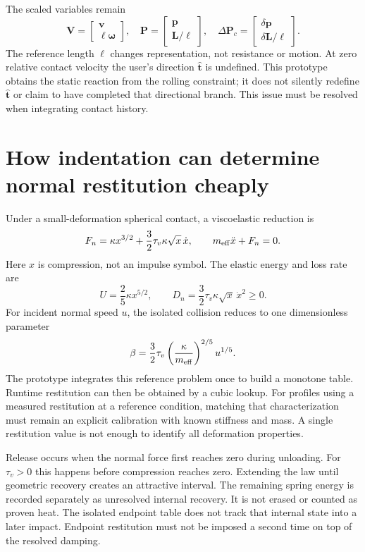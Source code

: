 \documentclass[10pt,a4paper]{article}
\begin{document}
The scaled variables remain
\[
 \mathbf V=\begin{bmatrix}\mathbf v\\\ell\boldsymbol\omega\end{bmatrix},\quad
 \mathbf P=\begin{bmatrix}\mathbf p\\\mathbf L/\ell\end{bmatrix},\quad
 \Delta\mathbf P_c=\begin{bmatrix}\delta\mathbf p\\\delta\mathbf L/\ell\end{bmatrix}.
\]
The reference length $\ell$ changes representation, not resistance or motion.
At zero relative contact velocity the user's direction $\hat{\mathbf t}$ is
undefined. This prototype obtains the static reaction from the rolling constraint;
it does not silently redefine $\hat{\mathbf t}$ or claim to have completed that
directional branch. This issue must be resolved when integrating contact history.

\newpage
\section*{How indentation can determine normal restitution cheaply}
Under a small-deformation spherical contact, a viscoelastic reduction is
\[
 F_n=\kappa x^{3/2}+\frac32\tau_v\kappa\sqrt{x}\,\dot x,\qquad
 m_{\rm eff}\ddot x+F_n=0.
\]
Here $x$ is compression, not an impulse symbol. The elastic energy and loss rate are
\[
 U=\frac25\kappa x^{5/2},\qquad
 D_n=\frac32\tau_v\kappa\sqrt{x}\,\dot x^2\ge0.
\]
For incident normal speed $u$, the isolated collision reduces to one dimensionless
parameter
\[
 \beta=\frac32\tau_v\left(\frac{\kappa}{m_{\rm eff}}\right)^{2/5}u^{1/5}.
\]
The prototype integrates this reference problem once to build a monotone table.
Runtime restitution can then be obtained by a cubic lookup. For profiles using
a measured restitution at a reference condition, matching that characterization
must remain an explicit calibration with known stiffness and mass. A single
restitution value is not enough to identify all deformation properties.

Release occurs when the normal force first reaches zero during unloading.
For $\tau_v>0$ this happens before compression reaches zero. Extending the law
until geometric recovery creates an attractive interval. The remaining spring
energy is recorded separately as unresolved internal recovery. It is not erased
or counted as proven heat. The isolated endpoint table does not track that internal
state into a later impact. Endpoint restitution must not be imposed a second time
on top of the resolved damping.
\end{document}
